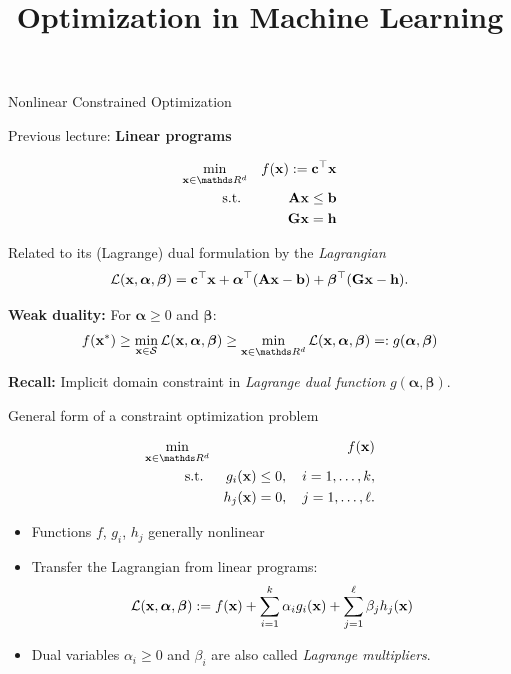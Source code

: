 \documentclass[11pt,compress,t,notes=noshow, xcolor=table]{beamer}
\title{Optimization in Machine Learning}
\date{}
\begin{document}
\sloppy
\begin{vbframe}{Nonlinear Constrained Optimization}

Previous lecture: \textbf{Linear programs}

\vspace{-\baselineskip}

\begin{eqnarray*}
 \min_{\xv \in \R^d} && f(\xv) := \mathbf{c}^\top\xv \\
\text{s.t. } &&  \Amat \xv \le \mathbf{b}\\
             && \mathbf{G} \xv = \mathbf{h} 
\end{eqnarray*}

Related to its (Lagrange) dual formulation by the \textit{Lagrangian}
\begin{equation*}
    \mathcal{L}(\mathbf{x},\bm{\alpha},\bm{\beta}) = \mathbf{c}^\top \mathbf{x} + \bm{\alpha}^\top (\mathbf{A} \mathbf{x} - \mathbf{b}) + \bm{\beta}^\top (\mathbf{G} \mathbf{x} - \mathbf{h}).
\end{equation*}

\textbf{Weak duality:} For $\bm{\alpha} \geq 0$ and $\bm{\beta}$:
\begin{equation*}
    f(\xv^\ast) \geq \min_{\xv \in \mathcal{S}} \mathcal{L}(\xv, \bm{\alpha}, \bm{\beta}) \geq \min_{\xv \in \R^d} \mathcal{L}(\xv, \bm{\alpha}, \bm{\beta}) =: g(\bm{\alpha}, \bm{\beta})
\end{equation*}

\textbf{Recall:} Implicit domain constraint in \textit{Lagrange dual function} $g(\bm{\alpha}, \bm{\beta})$.

\framebreak

General form of a constraint optimization problem

\vspace{-\baselineskip}

\begin{eqnarray*}
 \min_{\xv \in \R^d} && f(\xv) \\
\text{s.t. } && g_i(\xv) \le 0, \quad i=1,\ldots, k, \\
             && h_j(\xv) = 0, \quad j=1,\ldots, \ell.
\end{eqnarray*}

\begin{itemize}
    \item Functions $f$, $g_i$, $h_j$ generally nonlinear
    \item Transfer the Lagrangian from linear programs:
        \begin{equation*}
            \mathcal{L}(\mathbf{x}, \bm{\alpha}, \bm{\beta}) := f(\mathbf{x}) + \sum_{i=1}^k \alpha_i g_i(\mathbf{x}) + \sum_{j=1}^\ell \beta_j h_j(\mathbf{x})
        \end{equation*}
    \item Dual variables $\alpha_i \ge 0$ and $\beta_i$ are also called \textit{Lagrange multipliers}.
\end{itemize}

\end{vbframe}
\end{document}
